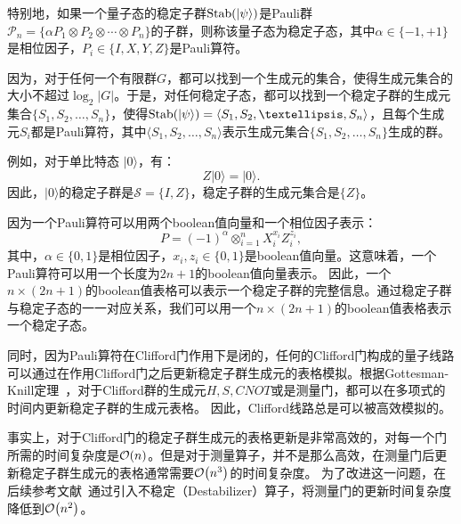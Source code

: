 特别地，如果一个量子态的稳定子群$\text{Stab}(\ket{\psi})$是Pauli群$\mathcal{P}_n=\{ \alpha P_{1} \otimes P_{2} \otimes \cdots \otimes P_{n}\}$的子群，则称该量子态为稳定子态，其中$\alpha\in\{-1,+1\}$是相位因子，$P_i\in\{I,X,Y,Z\}$是Pauli算符。

因为，对于任何一个有限群$G$，都可以找到一个生成元的集合，使得生成元集合的大小不超过$\log_2|G|$。于是，对任何稳定子态，都可以找到一个稳定子群的生成元集合$\{S_1, S_2, …, S_n\}$，使得$\text{Stab}(\ket{\psi})=\langle S_1, S_2, …, S_n \rangle$，且每个生成元$S_i$都是Pauli算符，其中$\langle S_1, S_2, …, S_n \rangle$表示生成元集合$\{S_1, S_2, …, S_n\}$生成的群。

例如，对于单比特态 $|0\rangle$，有：
\begin{equation}
    Z |0\rangle = |0\rangle.
\end{equation}
因此，$|0\rangle$的稳定子群是$\mathcal{S} = \{I,Z\}$，稳定子群的生成元集合是$\{Z\}$。

因为一个Pauli算符可以用两个boolean值向量和一个相位因子表示：
\begin{equation}
    P = (-1)^\alpha \otimes_{i=1}^n X_i^{x_i} Z_i^{z_i},
\end{equation}
其中，$\alpha\in\{0,1\}$是相位因子，$x_i, z_i\in\{0,1\}$是boolean值向量。这意味着，一个Pauli算符可以用一个长度为$2n+1$的boolean值向量表示。
因此，一个$n\times (2n+1)$的boolean值表格可以表示一个稳定子群的完整信息。通过稳定子群与稳定子态的一一对应关系，我们可以用一个$n\times (2n+1)$的boolean值表格表示一个稳定子态。

同时，因为Pauli算符在Clifford门作用下是闭的，任何的Clifford门构成的量子线路可以通过在作用Clifford门之后更新稳定子群生成元的表格模拟。根据Gottesman-Knill定理~\cite{gottesman1998heisenberg}，对于Clifford群的生成元$H, S, CNOT$或是测量门，都可以在多项式的时间内更新稳定子群的生成元表格。
因此，Clifford线路总是可以被高效模拟的。

事实上，对于Clifford门的稳定子群生成元的表格更新是非常高效的，对每一个门所需的时间复杂度是$\order{n}$。但是对于测量算子，并不是那么高效，在测量门后更新稳定子群生成元的表格通常需要$\order{n^3}$的时间复杂度。
为了改进这一问题，在后续参考文献~\cite{PhysRevA.70.052328}通过引入不稳定（Destabilizer）算子，将测量门的更新时间复杂度降低到$\order{n^2}$。

